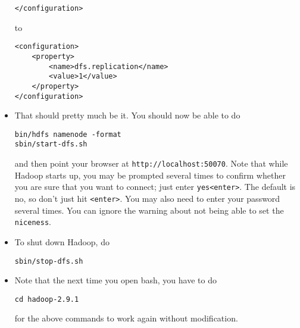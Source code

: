 \documentclass[11pt,a4paper]{article}
\begin{document}
\begin{itemize}
\begin{verbatim}
</configuration>
\end{verbatim}
to
\begin{verbatim}
<configuration>
    <property>
        <name>dfs.replication</name>
        <value>1</value>
    </property>
</configuration>
\end{verbatim}

\item That should pretty much be it. You should now be able to do
\begin{verbatim}
bin/hdfs namenode -format
sbin/start-dfs.sh
\end{verbatim}
and then point your browser at \verb+http://localhost:50070+. Note that while Hadoop starts up, you may be prompted several times to confirm whether you are sure that you want to connect; just enter \verb+yes<enter>+. The default is no, so don't just hit \verb+<enter>+. You may also need to enter your password several times. You can ignore the warning about not being able to set the \texttt{niceness}.
\item To shut down Hadoop, do
\begin{verbatim}
sbin/stop-dfs.sh
\end{verbatim}
\item Note that the next time you open bash, you have to do
\begin{verbatim}
cd hadoop-2.9.1
\end{verbatim}
for the above commands to work again without modification.
\end{itemize}
\end{document}
